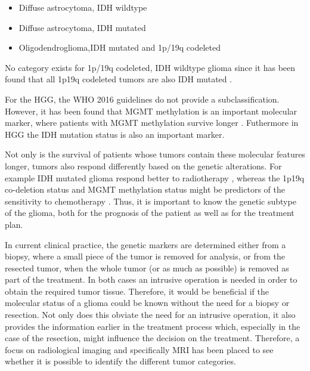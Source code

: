 \begin{itemize}
    \item Diffuse astrocytoma, \gls{IDH} wildtype
    \item Diffuse astrocytoma, \gls{IDH} mutated
    \item Oligodendroglioma,\gls{IDH} mutated and 1p/19q codeleted
\end{itemize}

No category exists for 1p/19q codeleted, \gls{IDH} wildtype glioma since it has been found that all 1p19q codeleted tumors are also IDH mutated \autocite{labussi20101p19qcodeletedIDH}.

For the \gls{HGG}, the WHO 2016 guidelines do not provide a subclassification.
However, it has been found that \gls{MGMT} methylation is an important molecular marker, where patients with \gls{MGMT} methylation survive longer \autocite{martinez2007MGMT, gessler2018MGMT}.
Futhermore in \gls{HGG} the \gls{IDH} mutation status is also an important marker.

Not only is the survival of patients whose tumors contain these molecular features longer, tumors also respond differently based on the genetic alterations.
For example \gls{IDH} mutated glioma respond better to radiotherapy \autocite{juratli2015IDHtreatment}, whereas the 1p19q co-deletion status and MGMT methylation status might be predictors of the sensitivity to chemotherapy \autocite{idbaih2007markersresponse}.
Thus, it is important to know the genetic subtype of the glioma, both for the prognosis of the patient as well as for the treatment plan.

In current clinical practice, the genetic markers are determined either from a biopsy, where a small piece of the tumor is removed for analysis, or from the resected tumor, when the whole tumor (or as much as possible) is removed as part of the treatment.
In both cases an intrusive operation is needed in order to obtain the required tumor tissue.
Therefore, it would be beneficial if the molecular status of a glioma could be known without the need for a biopsy or resection.
Not only does this obviate the need for an intrusive operation, it also provides the information earlier in the treatment process which, especially in the case of the resection, might influence the decision on the treatment.
Therefore, a focus on radiological imaging and specifically \gls{MRI} has been placed to see whether it is possible to identify the different tumor categories.

